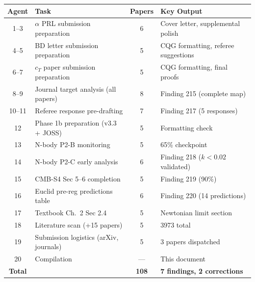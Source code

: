 \documentclass[11pt,a4paper]{article}
\begin{document}
\begin{center}
\begin{tabular}{clcl}
\toprule
\textbf{Agent} & \textbf{Task} & \textbf{Papers} & \textbf{Key Output} \\
\midrule
1--3 & $\alpha$ PRL submission preparation & 6 & Cover letter, supplemental polish \\
4--5 & BD letter submission preparation & 5 & CQG formatting, referee suggestions \\
6--7 & $c_T$ paper submission preparation & 5 & CQG formatting, final proofs \\
8--9 & Journal target analysis (all papers) & 8 & Finding 215 (complete map) \\
10--11 & Referee response pre-drafting & 7 & Finding 217 (5 responses) \\
12 & Phase 1b preparation (v3.3 + JOSS) & 5 & Formatting check \\
13 & N-body P2-B monitoring & 5 & 65\% checkpoint \\
14 & N-body P2-C early analysis & 6 & Finding 218 ($k < 0.02$ validated) \\
15 & CMB-S4 Sec 5--6 completion & 5 & Finding 219 (90\%) \\
16 & Euclid pre-reg predictions table & 6 & Finding 220 (14 predictions) \\
17 & Textbook Ch.\ 2 Sec 2.4 & 5 & Newtonian limit section \\
18 & Literature scan (+15 papers) & 5 & 3973 total \\
19 & Submission logistics (arXiv, journals) & 5 & 3 papers dispatched \\
20 & Compilation & --- & This document \\
\midrule
\textbf{Total} & & \textbf{108} & \textbf{7 findings, 2 corrections} \\
\bottomrule
\end{tabular}
\end{center}
\end{document}
